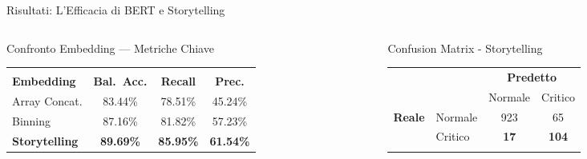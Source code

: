 \documentclass[aspectratio=169, 10pt]{beamer}
\begin{document}
\begin{frame}{Risultati: L'Efficacia di BERT e Storytelling}
  \vspace{0.5em}
  \begin{columns}[T]
    \begin{column}{0.55\textwidth}
      \begin{block}{Confronto Embedding — Metriche Chiave}
        \centering
        \footnotesize
        \renewcommand{\arraystretch}{1.3}
        \begin{tabular}{lccc}
          \toprule
          & & & \\[-1em] %
          \textbf{Embedding} & \textbf{Bal.\ Acc.} & \textbf{Recall} & \textbf{Prec.} \\
          \midrule
          Array Concat. & 83.44\% & 78.51\% & 45.24\% \\
          Binning       & 87.16\% & 81.82\% & 57.23\% \\
          \alert{\textbf{Storytelling}} & \alert{\textbf{89.69\%}} & \alert{\textbf{85.95\%}} & \alert{\textbf{61.54\%}} \\
          \bottomrule
        \end{tabular}
      \end{block}
    \end{column}

    \begin{column}{0.42\textwidth}
      \begin{block}{Confusion Matrix - Storytelling}
        \centering
        \footnotesize
        \renewcommand{\arraystretch}{1.3}
        \begin{tabular}{llcc}
          \toprule
          & & \multicolumn{2}{c}{\textbf{Predetto}} \\
          \cmidrule{3-4}
          & & Normale & Critico \\
          \midrule
          \multirow{2}{*}{\textbf{Reale}} & Normale & 923 & 65 \\
          & Critico & \alert{\textbf{17}} & \textbf{104} \\
          & & & \\[-1.55em] %
          \bottomrule
        \end{tabular}
      \end{block}
    \end{column}
  \end{columns}


\end{frame}
\end{document}
